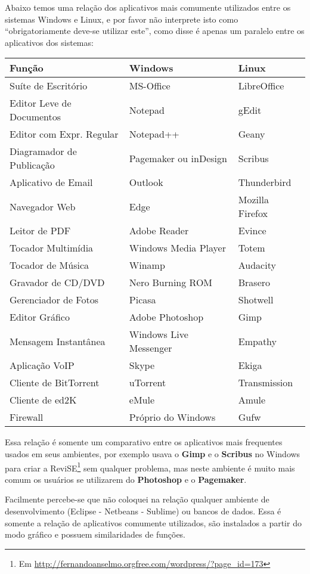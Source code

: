 Abaixo temos uma relação dos aplicativos mais comumente utilizados entre os sistemas Windows e Linux, e por favor não interprete isto como ``obrigatoriamente deve-se utilizar este'', como disse é apenas um paralelo entre os aplicativos dos sistemas:
\begin{center}
 \begin{longtable}[h!]{l|l|l}
  \textbf{Função} & \textbf{Windows} & \textbf{Linux} \\
  \hline
  Suíte de Escritório & MS-Office & LibreOffice \\
  Editor Leve de Documentos & Notepad & gEdit \\
  Editor com Expr. Regular & Notepad++ & Geany \\
  Diagramador de Publicação & Pagemaker ou inDesign & Scribus \\
  Aplicativo de Email & Outlook & Thunderbird \\
  Navegador Web & Edge & Mozilla Firefox \\
  Leitor de PDF & Adobe Reader & Evince \\
  Tocador Multimídia & Windows Media Player & Totem \\
  Tocador de Música & Winamp & Audacity \\
  Gravador de CD/DVD & Nero Burning ROM & Brasero \\
  Gerenciador de Fotos & Picasa & Shotwell \\
  Editor Gráfico & Adobe Photoshop & Gimp \\
  Mensagem Instantânea & Windows Live Messenger & Empathy \\
  Aplicação VoIP & Skype & Ekiga \\
  Cliente de BitTorrent & uTorrent & Transmission \\
  Cliente de ed2K & eMule & Amule \\
  Firewall & Próprio do Windows & Gufw
 \end{longtable}
\end{center} \vspace{-3em}

Essa relação é somente um comparativo entre os aplicativos mais frequentes usados em seus ambientes, por exemplo usava o \textbf{Gimp} e o \textbf{Scribus} no Windows para criar a ReviSE\footnote{Em \url{http://fernandoanselmo.orgfree.com/wordpress/?page_id=173}} sem qualquer problema, mas neste ambiente é muito mais comum os usuários se utilizarem do \textbf{Photoshop} e o \textbf{Pagemaker}.

Facilmente percebe-se que não coloquei na relação qualquer ambiente de desenvolvimento (Eclipse - Netbeans - Sublime) ou bancos de dados. Essa é somente a relação de aplicativos comumente utilizados, são instalados a partir do modo gráfico e possuem similaridades de funções.


